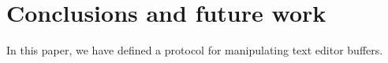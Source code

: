 \section{Conclusions and future work}

In this paper, we have defined a \clos{} protocol for manipulating
text editor buffers.
